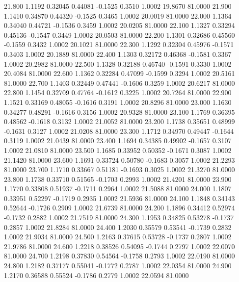   21.800   1.1192   0.32045   0.44081  -0.1525   0.3510   1.0002  19.8670  81.0000
  21.900   1.1410   0.34870   0.44320  -0.1525   0.3465   1.0002  20.0019  81.0000
  22.000   1.1364   0.34040   0.44721  -0.1536   0.3459   1.0002  20.0205  81.0000
  22.100   1.1327   0.33294   0.45136  -0.1547   0.3449   1.0002  20.0503  81.0000
  22.200   1.1301   0.32686   0.45560  -0.1559   0.3432   1.0002  20.1021  81.0000
  22.300   1.1292   0.32304   0.45976  -0.1571   0.3403   1.0002  20.1889  81.0000
  22.400   1.1303   0.32172   0.46368  -0.1581   0.3367   1.0002  20.2982  81.0000
  22.500   1.1328   0.32188   0.46740  -0.1591   0.3330   1.0002  20.4084  81.0000
  22.600   1.1362   0.32284   0.47099  -0.1599   0.3294   1.0002  20.5161  81.0000
  22.700   1.1403   0.32449   0.47441  -0.1606   0.3259   1.0002  20.6217  81.0000
  22.800   1.1454   0.32709   0.47764  -0.1612   0.3225   1.0002  20.7264  81.0000
  22.900   1.1521   0.33169   0.48055  -0.1616   0.3191   1.0002  20.8296  81.0000
  23.000   1.1630   0.34277   0.48291  -0.1616   0.3156   1.0002  20.9328  81.0000
  23.100   1.1769   0.36395   0.48562  -0.1618   0.3132   1.0002  21.0052  81.0000
  23.200   1.1738   0.35651   0.48999  -0.1631   0.3127   1.0002  21.0208  81.0000
  23.300   1.1712   0.34970   0.49447  -0.1644   0.3119   1.0002  21.0439  81.0000
  23.400   1.1694   0.34385   0.49902  -0.1657   0.3107   1.0002  21.0810  81.0000
  23.500   1.1685   0.33952   0.50352  -0.1671   0.3087   1.0002  21.1420  81.0000
  23.600   1.1691   0.33724   0.50780  -0.1683   0.3057   1.0002  21.2293  81.0000
  23.700   1.1710   0.33667   0.51181  -0.1693   0.3025   1.0002  21.3270  81.0000
  23.800   1.1738   0.33710   0.51565  -0.1703   0.2993   1.0002  21.4201  81.0000
  23.900   1.1770   0.33808   0.51937  -0.1711   0.2964   1.0002  21.5088  81.0000
  24.000   1.1807   0.33951   0.52297  -0.1719   0.2935   1.0002  21.5936  81.0000
  24.100   1.1848   0.34143   0.52644  -0.1726   0.2909   1.0002  21.6739  81.0000
  24.200   1.1896   0.34412   0.52974  -0.1732   0.2882   1.0002  21.7519  81.0000
  24.300   1.1953   0.34825   0.53278  -0.1737   0.2857   1.0002  21.8284  81.0000
  24.400   1.2030   0.35579   0.53541  -0.1739   0.2832   1.0002  21.9034  81.0000
  24.500   1.2163   0.37615   0.53728  -0.1737   0.2807   1.0002  21.9786  81.0000
  24.600   1.2218   0.38526   0.54095  -0.1744   0.2797   1.0002  22.0070  81.0000
  24.700   1.2198   0.37830   0.54564  -0.1758   0.2793   1.0002  22.0190  81.0000
  24.800   1.2182   0.37177   0.55041  -0.1772   0.2787   1.0002  22.0354  81.0000
  24.900   1.2170   0.36588   0.55524  -0.1786   0.2779   1.0002  22.0594  81.0000
